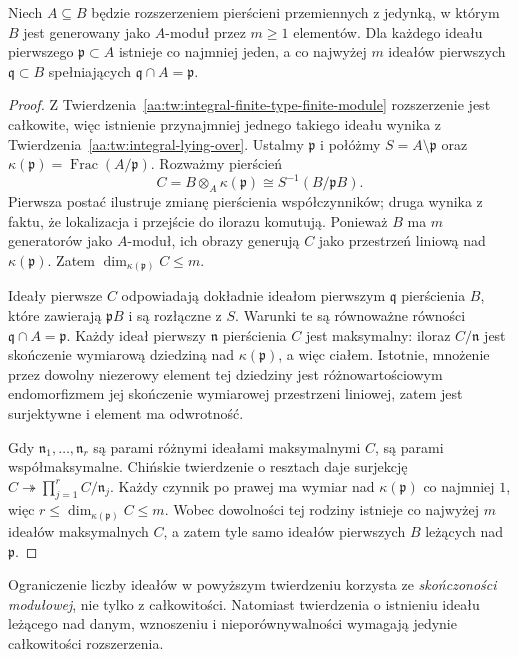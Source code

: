 \begin{twierdzenie}
\label{aa:tw:integral-finite-fibers}
Niech $A\subseteq B$ będzie rozszerzeniem pierścieni przemiennych
z jedynką, w którym $B$ jest generowany jako $A$-moduł przez
$m\ge1$ elementów. Dla każdego ideału pierwszego
$\mathfrak p\subset A$ istnieje co najmniej jeden, a co najwyżej
$m$ ideałów pierwszych $\mathfrak q\subset B$ spełniających
$\mathfrak q\cap A=\mathfrak p$.
\end{twierdzenie}
\begin{proof}
Z Twierdzenia~\ref{aa:tw:integral-finite-type-finite-module}
rozszerzenie jest całkowite, więc istnienie przynajmniej
jednego takiego ideału wynika z
Twierdzenia~\ref{aa:tw:integral-lying-over}.
Ustalmy $\mathfrak p$ i połóżmy
$S=A\setminus\mathfrak p$ oraz
$\kappa(\mathfrak p)=\operatorname{Frac}(A/\mathfrak p)$.
Rozważmy pierścień
\[
 C=B\otimes_A\kappa(\mathfrak p)
  \cong S^{-1}(B/\mathfrak p B).
\]
Pierwsza postać ilustruje zmianę pierścienia współczynników;
druga wynika z faktu, że lokalizacja i przejście do ilorazu
komutują. Ponieważ $B$ ma $m$ generatorów jako $A$-moduł,
ich obrazy generują $C$ jako przestrzeń liniową nad
$\kappa(\mathfrak p)$. Zatem
$\dim_{\kappa(\mathfrak p)}C\le m$.

Ideały pierwsze $C$ odpowiadają dokładnie ideałom pierwszym
$\mathfrak q$ pierścienia $B$, które zawierają
$\mathfrak p B$ i są rozłączne z $S$. Warunki te są równoważne
równości $\mathfrak q\cap A=\mathfrak p$.
Każdy ideał pierwszy $\mathfrak n$ pierścienia $C$ jest
maksymalny: iloraz $C/\mathfrak n$ jest skończenie wymiarową
dziedziną nad $\kappa(\mathfrak p)$, a więc ciałem.
Istotnie, mnożenie przez dowolny niezerowy element tej
dziedziny jest różnowartościowym endomorfizmem jej
skończenie wymiarowej przestrzeni liniowej, zatem jest
surjektywne i element ma odwrotność.

Gdy $\mathfrak n_1,\ldots,\mathfrak n_r$ są parami różnymi
ideałami maksymalnymi $C$, są parami współmaksymalne.
Chińskie twierdzenie o resztach daje surjekcję
$C\twoheadrightarrow\prod_{j=1}^r C/\mathfrak n_j$.
Każdy czynnik po prawej ma wymiar nad
$\kappa(\mathfrak p)$ co najmniej $1$, więc
$r\le\dim_{\kappa(\mathfrak p)}C\le m$.
Wobec dowolności tej rodziny istnieje co najwyżej
$m$ ideałów maksymalnych $C$, a zatem tyle samo
ideałów pierwszych $B$ leżących nad $\mathfrak p$.
\end{proof}

\begin{uwaga}\label{aa:uw:integral-fibers-finite-module}
Ograniczenie liczby ideałów w powyższym twierdzeniu
korzysta ze \emph{skończoności modułowej}, nie tylko
z całkowitości. Natomiast twierdzenia o istnieniu
ideału leżącego nad danym, wznoszeniu i nieporównywalności
wymagają jedynie całkowitości rozszerzenia.
\end{uwaga}

